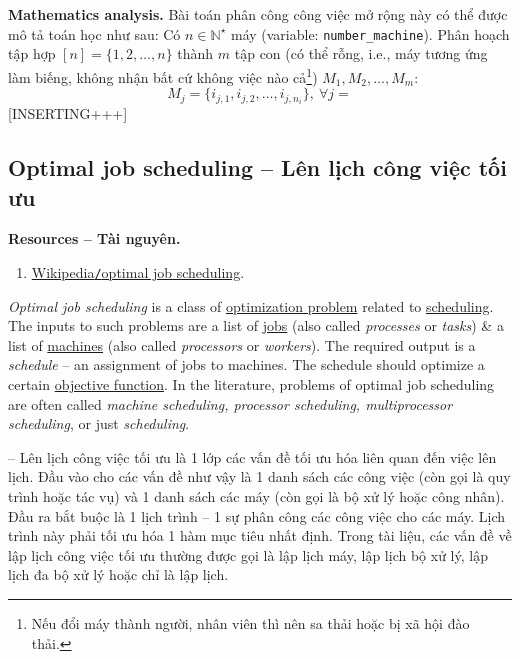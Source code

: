 \documentclass{article}
\begin{document}
\textbf{\textsf{Mathematics analysis.}} Bài toán phân công công việc mở rộng này có thể được mô tả toán học như sau: Có $n\in\mathbb{N}^\star$ máy (variable: \verb|number_machine|). Phân hoạch tập hợp $[n] = \{1,2,\ldots,n\}$ thành $m$ tập con (có thể rỗng, i.e., máy tương ứng làm biếng, không nhận bất cứ không việc nào cả\footnote{Nếu đổi máy thành người, nhân viên thì nên sa thải hoặc bị xã hội đào thải.}) $M_1,M_2,\ldots,M_m$:
\begin{equation*}
	M_j = \{i_{j,1},i_{j,2},\ldots,i_{j,n_i}\},\ \forall j = 
\end{equation*}
[INSERTING+++]


\subsection{Optimal job scheduling -- Lên lịch công việc tối ưu}
\textbf{\textbf{Resources -- Tài nguyên.}}
\begin{enumerate}
	\item \href{https://en.wikipedia.org/wiki/Optimal_job_scheduling}{Wikipedia{\tt/}optimal job scheduling}.
\end{enumerate}
{\it Optimal job scheduling} is a class of \href{https://en.wikipedia.org/wiki/Optimization_problem}{optimization problem} related to \href{https://en.wikipedia.org/wiki/Scheduling_(computing)}{scheduling}. The inputs to such problems are a list of \href{https://en.wikipedia.org/wiki/Job_(computing)}{jobs} (also called {\it processes} or {\it tasks}) \& a list of \href{https://en.wikipedia.org/wiki/Processor_(computing)}{machines} (also called {\it processors} or {\it workers}). The required output is a {\it schedule} -- an assignment of jobs to machines. The schedule should optimize a certain \href{https://en.wikipedia.org/wiki/Objective_function}{objective function}. In the literature, problems of optimal job scheduling are often called {\it machine scheduling, processor scheduling, multiprocessor scheduling}, or just {\it scheduling}.

-- Lên lịch công việc tối ưu là 1 lớp các vấn đề tối ưu hóa liên quan đến việc lên lịch. Đầu vào cho các vấn đề như vậy là 1 danh sách các công việc (còn gọi là quy trình hoặc tác vụ) và 1 danh sách các máy (còn gọi là bộ xử lý hoặc công nhân). Đầu ra bắt buộc là 1 lịch trình – 1 sự phân công các công việc cho các máy. Lịch trình này phải tối ưu hóa 1 hàm mục tiêu nhất định. Trong tài liệu, các vấn đề về lập lịch công việc tối ưu thường được gọi là lập lịch máy, lập lịch bộ xử lý, lập lịch đa bộ xử lý hoặc chỉ là lập lịch.
\end{document}
